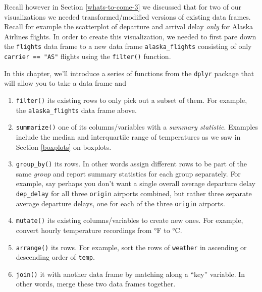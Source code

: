 \documentclass[12pt, krantz2,]{krantz}
\makeatletter
\newenvironment{Shaded}{\begin{snugshade}}{\end{snugshade}}
\newcommand{\DataTypeTok}[1]{\textcolor[rgb]{0.27,0.27,0.27}{#1}}
\newcommand{\KeywordTok}[1]{\textcolor[rgb]{0.27,0.27,0.27}{\textbf{#1}}}
\newcommand{\NormalTok}[1]{#1}
\newcommand{\OperatorTok}[1]{\textcolor[rgb]{0.43,0.43,0.43}{\textbf{#1}}}
\newcommand{\StringTok}[1]{\textcolor[rgb]{0.5,0.5,0.5}{#1}}
\providecommand{\tightlist}{%
  \setlength{\itemsep}{0pt}\setlength{\parskip}{0pt}}
\newenvironment{kframe}{%
\medskip{}
\setlength{\fboxsep}{.8em}
 \def\at@end@of@kframe{}%
 \ifinner\ifhmode%
  \def\at@end@of@kframe{\end{minipage}}%
  \begin{minipage}{\columnwidth}%
 \fi\fi%
 \def\FrameCommand##1{\hskip\@totalleftmargin \hskip-\fboxsep
 \colorbox{shadecolor}{##1}\hskip-\fboxsep
     \hskip-\linewidth \hskip-\@totalleftmargin \hskip\columnwidth}%
 \MakeFramed {\advance\hsize-\width
   \@totalleftmargin\z@ \linewidth\hsize
   \@setminipage}}%
 {\par\unskip\endMakeFramed%
 \at@end@of@kframe}
\renewenvironment{Shaded}{\begin{kframe}}{\end{kframe}}
\makeatother
\begin{document}
Recall however in Section \ref{whats-to-come-3} we discussed that for two of our visualizations we needed transformed/modified versions of existing data frames. Recall for example the scatterplot of departure and arrival delay \emph{only} for Alaska Airlines flights. In order to create this visualization, we needed to first pare down the \texttt{flights} data frame to a new data frame \texttt{alaska\_flights} consisting of only \texttt{carrier\ ==\ "AS"} flights using the \texttt{filter()} function.

\begin{Shaded}
\end{Shaded}

In this chapter, we'll introduce a series of functions from the \texttt{dplyr} package that will allow you to take a data frame and

\begin{enumerate}
\def\labelenumi{\arabic{enumi}.}
\tightlist
\item
  \texttt{filter()} its existing rows to only pick out a subset of them. For example, the \texttt{alaska\_flights} data frame above.
\item
  \texttt{summarize()} one of its columns/variables with a \emph{summary statistic}. Examples include the median and interquartile range of temperatures as we saw in Section \ref{boxplots} on boxplots.
\item
  \texttt{group\_by()} its rows. In other words assign different rows to be part of the same \emph{group} and report summary statistics for each group separately. For example, say perhaps you don't want a single overall average departure delay \texttt{dep\_delay} for all three \texttt{origin} airports combined, but rather three separate average departure delays, one for each of the three \texttt{origin} airports.
\item
  \texttt{mutate()} its existing columns/variables to create new ones. For example, convert hourly temperature recordings from °F to °C.
\item
  \texttt{arrange()} its rows. For example, sort the rows of \texttt{weather} in ascending or descending order of \texttt{temp}.
\item
  \texttt{join()} it with another data frame by matching along a ``key'' variable. In other words, merge these two data frames together.
\end{enumerate}
\end{document}
